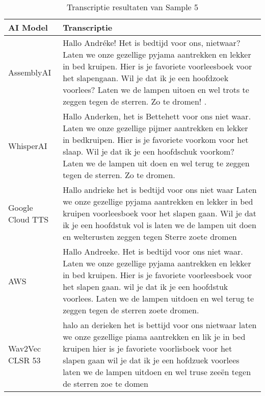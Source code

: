 \begin{table}[htbp]
    \centering
    \caption{Transcriptie resultaten van Sample 5}
    \label{tab:results_sample4}
    \begin{tabularx}{\textwidth}{|l|X|}
        \hline
        \textbf{AI Model} & \textbf{Transcriptie} \\
        \hline
        AssemblyAI &         Hallo Andréke! Het is bedtijd voor ons, nietwaar? Laten we onze gezellige pyjama aantrekken en lekker in bed kruipen. Hier is je favoriete voorleesboek voor het slapengaan. Wil je dat ik je een hoofdzoek voorlees? Laten we de lampen uitoen en wel trots te zeggen tegen de sterren. Zo te dromen!
        .
        
        
        \\ \hline
        
        WhisperAI &           Hallo Anderken, het is Bettehett voor ons niet waar. Laten we onze gezellige pijmer aantrekken en lekker in bedkruipen. Hier is je favoriete voorkom voor het slaap. Wil je dat ik je een hoofdschuk voorkom? Laten we de lampen uit doen en wel terug te zeggen tegen de sterren. Zo te dromen.
        
        
        
        \\ \hline
        
        Google Cloud TTS &           Hallo andrieke het is bedtijd voor ons niet waar Laten we onze gezellige pyjama aantrekken en lekker in bed kruipen voorleesboek voor het slapen gaan. Wil je dat ik je een hoofdstuk vol is laten we de lampen uit doen en welterusten zeggen tegen Sterre zoete dromen
        
        
        
        \\ \hline
        
        AWS &           Hallo Andreeke. Het is bedtijd voor ons niet waar. Laten we onze gezellige pyjama aantrekken en lekker in bed kruipen. Hier is je favoriete voorleesboek voor het slapen gaan. wil je dat ik je een hoofdstuk voorlees. Laten we de lampen uitdoen en wel terug te zeggen tegen de sterren zoete dromen.
        
        
        
        \\ \hline
        
        Wav2Vec  CLSR 53 &       halo an derieken het is bettijd voor ons nietwaar laten we onze gezellige piama aantrekken en lik je in bed kruipen hier is je favoriete voorlisboek voor het slapen gaan wil je dat ik je een hofdzuek voorlees laten we de lampen uitdoen en wel truse zeeën tegen de sterren zoe te domen
        

\end{tabularx}
\end{table}

